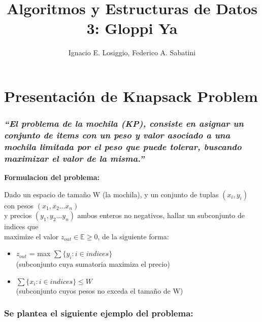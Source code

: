\documentclass[fleqn, 11pt]{article}
\title{Algoritmos y Estructuras de Datos 3: Gloppi Ya}
\author{Ignacio E. Losiggio, Federico A. Sabatini}
\begin{document}
\maketitle
\section{Presentación de Knapsack Problem}

\subsubsection{\textit{``El problema de la mochila (KP), consiste en asignar un conjunto de items con un peso y valor asociado a una mochila limitada por el peso que puede tolerar, buscando maximizar el valor de la misma.''}}


\textbf{Formulacion del problema:}

Dado un espacio de tamaño W (la mochila), y un conjunto de tuplas $(x_i, y_i)$ con pesos $(x_1, x_2 \dots x_n)$ \\
y precios $(y_1, y_2 \dots y_n)$ ambos enteros no negativos, hallar un subconjunto de indices que \\
maximize el valor $z_{out} \in\mathbb{E} \geq 0$, de la siguiente forma:

\begin{itemize}
	\item $z_{out} $ = max $\sum \{ y_i : i \in indices \} $ \\ (subconjunto cuya sumatoria maximiza el precio)
	\item $\sum \{ x_i : i \in indices \} \le W $ \\ (subconjunto cuyos pesos no exceda el tamaño de W)
\end{itemize}

\subsubsection{Se plantea el siguiente ejemplo del problema:}
\end{document}
